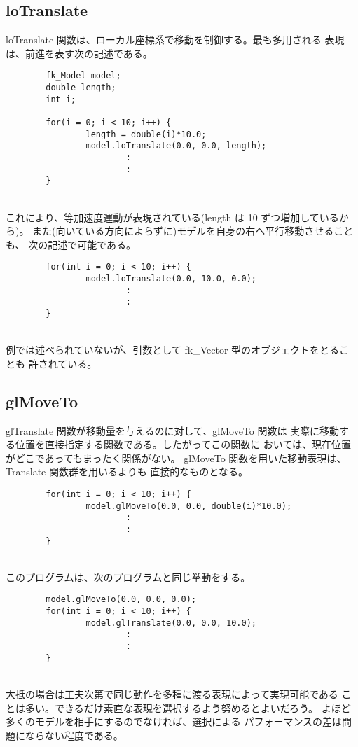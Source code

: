 \subsection{loTranslate}
loTranslate 関数は、ローカル座標系で移動を制御する。最も多用される
表現は、前進を表す次の記述である。
\\
\begin{breakbox}
\begin{verbatim}
        fk_Model model;
        double length;
        int i;

        for(i = 0; i < 10; i++) {
                length = double(i)*10.0;
                model.loTranslate(0.0, 0.0, length);
                        :
                        :
        }
\end{verbatim}
\end{breakbox}
~ \\
これにより、等加速度運動が表現されている(length は 10 ずつ増加しているから)。
また(向いている方向によらずに)モデルを自身の右へ平行移動させることも、
次の記述で可能である。
\\
\begin{breakbox}
\begin{verbatim}
        for(int i = 0; i < 10; i++) {
                model.loTranslate(0.0, 10.0, 0.0);
                        :
                        :
        }
\end{verbatim}
\end{breakbox}
~ \\
例では述べられていないが、引数として fk\_Vector 型のオブジェクトをとることも
許されている。
\subsection{glMoveTo}
glTranslate 関数が移動量を与えるのに対して、glMoveTo 関数は
実際に移動する位置を直接指定する関数である。したがってこの関数に
おいては、現在位置がどこであってもまったく関係がない。
glMoveTo 関数を用いた移動表現は、Translate 関数群を用いるよりも
直接的なものとなる。
\\
\begin{breakbox}
\begin{verbatim}
        for(int i = 0; i < 10; i++) {
                model.glMoveTo(0.0, 0.0, double(i)*10.0);
                        :
                        :
        }
\end{verbatim}
\end{breakbox}
~ \\
このプログラムは、次のプログラムと同じ挙動をする。
\\
\begin{breakbox}
\begin{verbatim}
        model.glMoveTo(0.0, 0.0, 0.0);
        for(int i = 0; i < 10; i++) {
                model.glTranslate(0.0, 0.0, 10.0);
                        :
                        :
        }
\end{verbatim}
\end{breakbox}
~ \\
大抵の場合は工夫次第で同じ動作を多種に渡る表現によって実現可能である
ことは多い。できるだけ素直な表現を選択するよう努めるとよいだろう。
よほど多くのモデルを相手にするのでなければ、選択による
パフォーマンスの差は問題にならない程度である。

